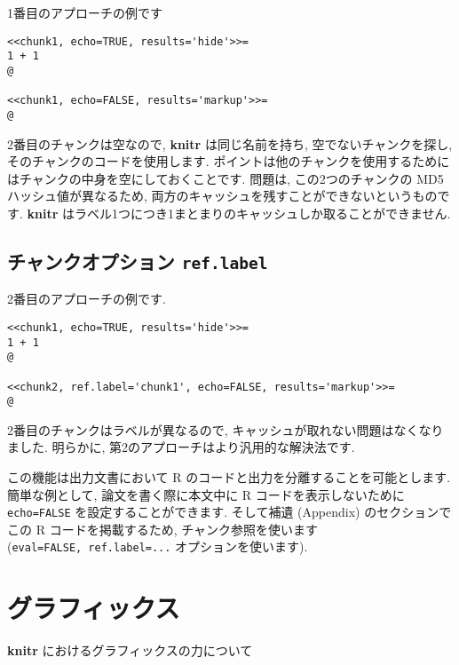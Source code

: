 \documentclass[
  lualatex,ja=standard,jafont=noto-otf]{bxjsreport}
\begin{document}
1番目のアプローチの例です

\begin{verbatim}
<<chunk1, echo=TRUE, results='hide'>>=
1 + 1
@

<<chunk1, echo=FALSE, results='markup'>>=
@
\end{verbatim}

2番目のチャンクは空なので, \textbf{knitr} は同じ名前を持ち,
空でないチャンクを探し, そのチャンクのコードを使用します.
ポイントは他のチャンクを使用するためにはチャンクの中身を空にしておくことです.
問題は, この2つのチャンクの MD5 ハッシュ値が異なるため,
両方のキャッシュを残すことができないというものです. \textbf{knitr}
はラベル1つにつき1まとまりのキャッシュしか取ることができません.

\hypertarget{ux30c1ux30e3ux30f3ux30afux30aaux30d7ux30b7ux30e7ux30f3-ref.label}{%
\section*{\texorpdfstring{チャンクオプション
\texttt{ref.label}}{チャンクオプション ref.label}}\label{ux30c1ux30e3ux30f3ux30afux30aaux30d7ux30b7ux30e7ux30f3-ref.label}}

2番目のアプローチの例です.

\begin{verbatim}
<<chunk1, echo=TRUE, results='hide'>>=
1 + 1
@

<<chunk2, ref.label='chunk1', echo=FALSE, results='markup'>>=
@
\end{verbatim}

2番目のチャンクはラベルが異なるので,
キャッシュが取れない問題はなくなりました. 明らかに,
第2のアプローチはより汎用的な解決法です.

この機能は出力文書において R のコードと出力を分離することを可能とします.
簡単な例として, 論文を書く際に本文中に R コードを表示しないために
\texttt{echo=FALSE} を設定することができます. そして補遺 (Appendix)
のセクションでこの R コードを掲載するため, チャンク参照を使います
(\texttt{eval=FALSE,\ ref.label=...} オプションを使います).

\hypertarget{graphics}{%
\chapter*{グラフィックス}\label{graphics}}

\textbf{knitr} におけるグラフィックスの力について
\end{document}
